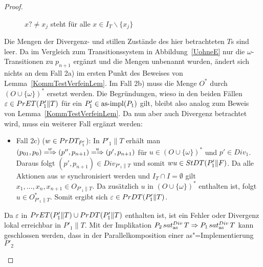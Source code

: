 \begin{proof}
\begin{itemize}
\begin{figure} [h!tbp]
\begin{center}
        \caption{$x?\neq x_j$ steht für alle $x\in I_T\backslash\{x_j\}$}
      \label{TohneEmitO}
      \end{center}
      \end{figure}
      Die Mengen der Divergenz- und stillen Zustände des hier betrachteten $T$s
      sind leer. Da im Vergleich zum Transitionssystem in
      Abbildung~\ref{UohneE} nur die $\omega$-Transitionen zu $p_{n+1}$ ergänzt
      und die Mengen unbenannt wurden, ändert sich nichts an dem Fall 2a) im
      ersten Punkt des Beweises von Lemma~\ref{KommTestVerfeinLem}. Im Fall 2b)
      muss die Menge $O^*$ durch $(O\cup\{\omega\})^*$ ersetzt werden. Die
      Begründungen, wieso in den beiden Fällen $\varepsilon\in PrET (P'_1\|T)$
      für ein $P'_1\in\mathrm{as}\text{-}\mathrm{impl} (P_1)$ gilt, bleibt also analog zum Beweis von
      Lemma~\ref{KommTestVerfeinLem}. Da nun aber auch Divergenz betrachtet
      wird, muss ein weiterer Fall ergänzt werden:
      \begin{itemize}
        \item Fall 2c) ($w\in PrDT _{P'_1}$): In $P'_1\|T$ erhält man
          $(p_{01},p_0) \weakmay[w] (p'',p_{n+1})\weakmay[u] (p',p_{n+1})$ für
          $u\in (O\cup \{\omega\})^*$ und $p'\in Div_1$. Daraus folgt
          $(p',p_{n+1})\in Div_{P'_1\|T}$ und somit $wu\in StDT (P'_1\|F)$. Da
          alle Aktionen aus $w$ synchronisiert werden und $I_T\cap
          I=\emptyset$ gilt $x_1,\dots , x_n, x_{n+1}\in O_{P'_1\|T}$. Da
          zusätzlich $u$ in $(O\cup \{\omega\}) ^*$ enthalten ist, folgt $u\in
          O^*_{P'_1\|T}$. Somit ergibt sich $\varepsilon\in PrDT (P'_1\|T)$.
      \end{itemize}
      Da $\varepsilon$ in $PrET (P'_1\|T) \cup PrDT (P'_1\|T)$ enthalten ist,
      ist ein Fehler oder Divergenz lokal erreichbar in $P'_1\|T$. Mit der
      Implikation $P_2 \hspace{0.05cm}sat_\mathrm{as}^{Div}\hspace{0.05cm} T\Rightarrow P_1 \hspace{0.05cm}sat_\mathrm{as}^{Div}\hspace{0.05cm} T$ kann geschlossen
      werden, dass in der Parallelkomposition einer as"=Implementierung $P'_2$

\end{itemize}
\end{proof}
